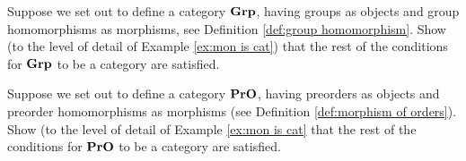 \documentclass[CT4S-EN-RU]{subfiles}
\begin{document}
\begin{exerciseENG}
Suppose we set out to define a category ${\bf Grp}$, having groups as objects and group homomorphisms as morphisms, see Definition \ref{def:group homomorphism}. Show (to the level of detail of Example \ref{ex:mon is cat}) that the rest of the conditions for ${\bf Grp}$ to be a category are satisfied.
\end{exerciseENG}

\begin{exerciseRUS}
\end{exerciseRUS}

\begin{exerciseENG}
Suppose we set out to define a category ${\bf PrO}$, having preorders as objects and preorder homomorphisms as morphisms (see Definition \ref{def:morphism of orders}). Show (to the level of detail of Example \ref{ex:mon is cat} that the rest of the conditions for ${\bf PrO}$ to be a category are satisfied.
\end{exerciseENG}

\begin{exerciseRUS}
\end{exerciseRUS}
\end{document}
